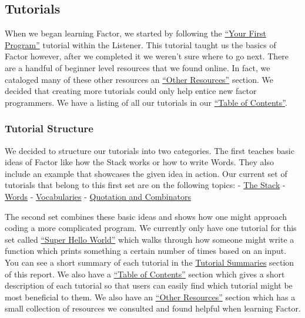 \documentclass[
]{article}
\begin{document}
\hypertarget{tutorials}{%
\subsection{Tutorials}\label{tutorials}}

When we began learning Factor, we started by following the
\href{https://docs.factorcode.org/content/article-first-program.html}{``Your
First Program''} tutorial within the Listener. This tutorial taught us
the basics of Factor however, after we completed it we weren't sure
where to go next. There are a handful of beginner level resources that
we found online. In fact, we cataloged many of these other resources an
\href{https://factor.netlify.app/book/Resources.md}{``Other Resources''}
section. We decided that creating more tutorials could only help entice
new factor programmers. We have a listing of all our tutorials in our
\href{https://factor.netlify.app/book/Table_of_Contents.md}{``Table of
Contents''}.

\hypertarget{tutorial-structure}{%
\subsubsection{Tutorial Structure}\label{tutorial-structure}}

We decided to structure our tutorials into two categories. The first
teaches basic ideas of Factor like how the Stack works or how to write
Words. They also include an example that showcases the given idea in
action. Our current set of tutorials that belong to this first set are
on the following topics: -
\href{https://factor.netlify.app/book/the-stack.md}{The Stack} -
\href{https://factor.netlify.app/book/words.md}{Words} -
\href{https://factor.netlify.app/book/vocabularies.md}{Vocabularies} -
\href{https://factor.netlify.app/book/quotations_combinators.md}{Quotation
and Combinators}

The second set combines these basic ideas and shows how one might
approach coding a more complicated program. We currently only have one
tutorial for this set called
\href{https://factor.netlify.app/book/Super_Hello_World.md}{``Super
Hello World''} which walks through how someone might write a function
which prints something a certain number of times based on an input. You
can see a short summary of each tutorial in the
\href{tutorials.md}{Tutorial Summaries} section of this report. We also
have a
\href{https://factor.netlify.app/book/Table_of_Contents.md}{``Table of
Contents''} section which gives a short description of each tutorial so
that users can easily find which tutorial might be most beneficial to
them. We also have an
\href{https://factor.netlify.app/book/Resources.md}{``Other Resources''}
section which has a small collection of resources we consulted and found
helpful when learning Factor.
\end{document}
